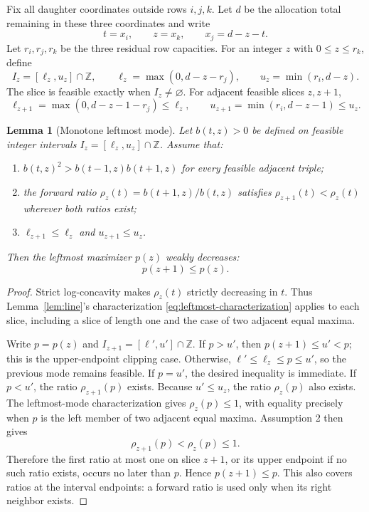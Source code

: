 \documentclass[10pt]{article}
\newtheorem{lemma}{Lemma}
\newcommand{\Z}{\mathbb Z}
\begin{document}
Fix all daughter coordinates outside rows \(i,j,k\).  Let \(d\) be the
allocation total remaining in these three coordinates and write
\[
 t=x_i,\qquad z=x_k,\qquad x_j=d-z-t.
\]
Let \(r_i,r_j,r_k\) be the three residual row capacities.  For an
integer \(z\) with \(0\le z\le r_k\), define
\begin{equation}
 I_z=[\ell_z,u_z]\cap\Z,\qquad
 \ell_z=\max(0,d-z-r_j),\qquad
 u_z=\min(r_i,d-z).
 \label{eq:slice-interval}
\end{equation}
The slice is feasible exactly when \(I_z\ne\varnothing\).  For adjacent
feasible slices \(z,z+1\),
\begin{equation}
 \ell_{z+1}=\max(0,d-z-1-r_j)\le\ell_z,\qquad
 u_{z+1}=\min(r_i,d-z-1)\le u_z.
 \label{eq:endpoints}
\end{equation}

\begin{lemma}[Monotone leftmost mode]
\label{lem:generic-mode}
Let \(b(t,z)>0\) be defined on feasible integer intervals
\(I_z=[\ell_z,u_z]\cap\Z\).  Assume that:
\begin{enumerate}
\item \(b(t,z)^2>b(t-1,z)b(t+1,z)\) for every feasible adjacent triple;
\item the forward ratio
\(\rho_z(t)=b(t+1,z)/b(t,z)\) satisfies
\(\rho_{z+1}(t)<\rho_z(t)\) wherever both ratios exist;
\item \(\ell_{z+1}\le\ell_z\) and \(u_{z+1}\le u_z\).
\end{enumerate}
Then the leftmost maximizer \(p(z)\) weakly decreases:
\[
 p(z+1)\le p(z).
\]
\end{lemma}

\begin{proof}
Strict log-concavity makes \(\rho_z(t)\) strictly decreasing in \(t\).
Thus Lemma~\ref{lem:line}'s characterization
\eqref{eq:leftmost-characterization} applies to each slice, including a
slice of length one and the case of two adjacent equal maxima.

Write \(p=p(z)\) and \(I_{z+1}=[\ell',u']\cap\Z\).
If \(p>u'\), then \(p(z+1)\le u'<p\); this is the upper-endpoint clipping
case.  Otherwise, \(\ell'\le\ell_z\le p\le u'\), so the previous mode
remains feasible.  If \(p=u'\), the desired inequality is immediate.
If \(p<u'\), the ratio \(\rho_{z+1}(p)\) exists.  Because
\(u'\le u_z\), the ratio \(\rho_z(p)\) also exists.  The leftmost-mode
characterization gives \(\rho_z(p)\le1\), with equality precisely when
\(p\) is the left member of two adjacent equal maxima.  Assumption 2
then gives
\[
  \rho_{z+1}(p)<\rho_z(p)\le1.
\]
Therefore the first ratio at most one on slice \(z+1\), or its upper
endpoint if no such ratio exists, occurs no later than \(p\).
Hence \(p(z+1)\le p\).  This also covers ratios at the interval
endpoints: a forward ratio is used only when its right neighbor exists.
\end{proof}
\end{document}
